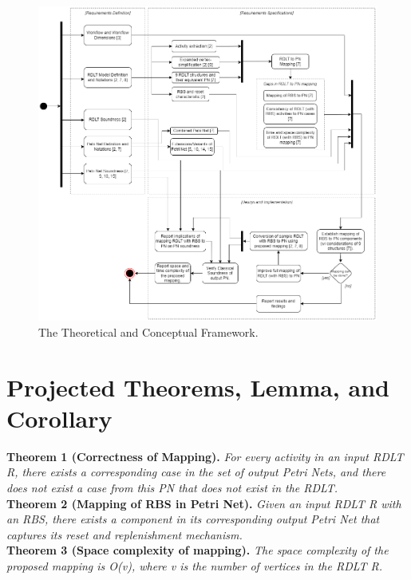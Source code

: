 \documentclass[12pt]{article}
\begin{document}
    \begin{figure}[p]
        \centering
        \includegraphics[scale=0.5]{figures/TCF_V5.png}
        \caption{The Theoretical and Conceptual Framework.}
        \label{tcf}
    \end{figure} \par

\section{Projected Theorems, Lemma, and Corollary}
    \textbf{Theorem 1 (Correctness of Mapping).} \textit{For every activity in an input RDLT R, there exists a corresponding case in the set of output Petri Nets, and there does not exist a case from this PN that does not exist in the RDLT.} \\

    \noindent \textbf{Theorem 2 (Mapping of RBS in Petri Net).} \textit{Given an input RDLT R with an RBS, there exists a component in its corresponding output Petri Net that captures its reset and replenishment mechanism.} \\

    \noindent \textbf{Theorem 3 (Space complexity of mapping).} \textit{The space complexity of the proposed mapping is O(v), where v is the number of vertices in the RDLT R.} \\
\end{document}
